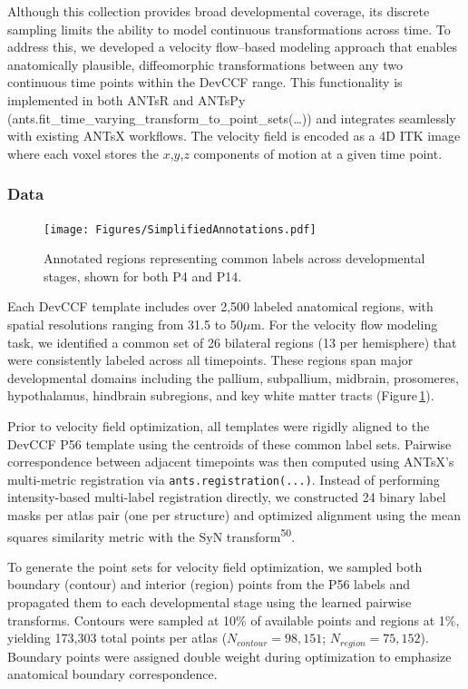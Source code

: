 \documentclass[
  12pt,
]{article}
\begin{document}
Although this collection provides broad developmental coverage, its
discrete sampling limits the ability to model continuous transformations
across time. To address this, we developed a velocity flow--based
modeling approach that enables anatomically plausible, diffeomorphic
transformations between any two continuous time points within the DevCCF
range. This functionality is implemented in both ANTsR and ANTsPy
(ants.fit\_time\_varying\_transform\_to\_point\_sets(\ldots)) and
integrates seamlessly with existing ANTsX workflows. The velocity field
is encoded as a 4D ITK image where each voxel stores the
\(x\),\(y\),\(z\) components of motion at a given time point.

\subsubsection{Data}\label{data}

\begin{figure}[!htb]
\centering
\texttt{[image: Figures/SimplifiedAnnotations.pdf]}
\caption{Annotated regions representing common labels across developmental
stages, shown for both P4 and P14.}
\label{fig:simplifiedannotations}
\end{figure}

Each DevCCF template includes over 2,500 labeled anatomical regions,
with spatial resolutions ranging from 31.5 to 50\(\mu\)m. For the
velocity flow modeling task, we identified a common set of 26 bilateral
regions (13 per hemisphere) that were consistently labeled across all
timepoints. These regions span major developmental domains including the
pallium, subpallium, midbrain, prosomeres, hypothalamus, hindbrain
subregions, and key white matter tracts
(Figure\,\ref{fig:simplifiedannotations}).

Prior to velocity field optimization, all templates were rigidly aligned
to the DevCCF P56 template using the centroids of these common label
sets. Pairwise correspondence between adjacent timepoints was then
computed using ANTsX's multi-metric registration via
\texttt{ants.registration(...)}. Instead of performing intensity-based
multi-label registration directly, we constructed 24 binary label masks
per atlas pair (one per structure) and optimized alignment using the
mean squares similarity metric with the SyN
transform\textsuperscript{50}.

To generate the point sets for velocity field optimization, we sampled
both boundary (contour) and interior (region) points from the P56 labels
and propagated them to each developmental stage using the learned
pairwise transforms. Contours were sampled at 10\% of available points
and regions at 1\%, yielding 173,303 total points per atlas
(\(N_{contour} = 98{,}151\); \(N_{region} =
75{,}152\)). Boundary points were assigned double weight during
optimization to emphasize anatomical boundary correspondence.
\end{document}
